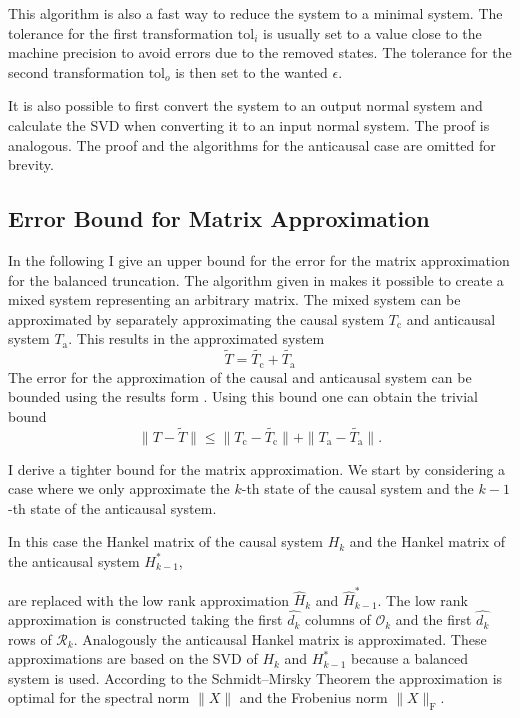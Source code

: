 \documentclass[numbers=noenddot,doctype=mastersthesis,BCOR=15mm,biblatex]{ldvbook}%
\newcommand{\R}{\mathcal{R}} %
\newcommand{\Ob}{\mathcal{O}} %
\begin{document}
This algorithm is also a fast way to reduce the system to a minimal system.
The tolerance for the first transformation $\text{tol}_i$ is usually set to a value close to the machine precision to avoid errors due to the removed states.
The tolerance for the second transformation $\text{tol}_o$ is then set to the wanted $\epsilon$.
 
It is also possible to first convert the system to an output normal system and calculate the SVD when converting it to an input normal system.
The proof is analogous.
The proof and the algorithms for the anticausal case are omitted for brevity.

 
\subsection{Error Bound for Matrix Approximation}

In the following I give an upper bound for the error for the matrix approximation for the balanced truncation.
The algorithm given in \cite{chandrasekaran_fast_2002} makes it possible to create a mixed system representing an arbitrary matrix.
The mixed system can be approximated by separately approximating the
causal system $T_{\text{c}}$ and anticausal system $T_{\text{a}}$.
This results in the approximated system
\begin{equation}
	\tilde{T} = \tilde{T_{\text{c}}} + \tilde{T_{\text{a}}}
\end{equation}
The error for the approximation of the causal and anticausal system can be bounded using the results form \cite{lall_error-bounds_2003}.
Using this bound one can obtain the trivial bound 
\begin{equation}
	\|T-\tilde{T}\| \leq \|T_\text{c} - \tilde{T_{\text{c}}}\| + \|T_\text{a} -\tilde{T_{\text{a}}}\|
	.
\end{equation}

I derive a tighter bound for the matrix approximation.
We start by considering a case where we only approximate the $k$-th state of the causal system and the $k-1$-th state of the anticausal system.

In this case the Hankel matrix of the causal system $H_k$ and the Hankel matrix of the anticausal system $H^*_{k-1}$,

are replaced with the low rank approximation $\hat{H}_k$ and $\hat{H}^*_{k-1}$.
The low rank approximation is constructed taking the first $\hat{d_k}$ columns of $\Ob_{k}$ and the first $\hat{d_k}$ rows of $\R_{k}$.
Analogously the anticausal Hankel matrix is approximated.
These approximations are based on the SVD of $H_k$ and $H^*_{k-1}$ because a balanced system is used.
According to the Schmidt–Mirsky Theorem \cite{bai_matrix_2021} the approximation is optimal for the spectral norm $\|X\|$ and the Frobenius norm $\|X\|_\text{F}$.
\end{document}
